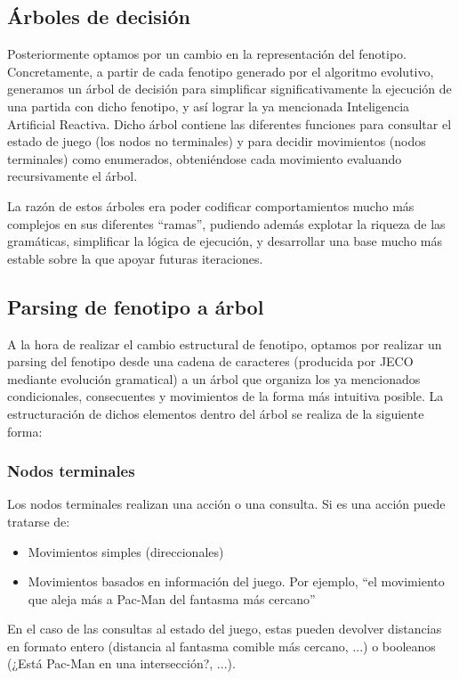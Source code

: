 \subsection{Árboles de decisión}
Posteriormente optamos por un cambio en la representación del fenotipo. Concretamente, a partir de cada fenotipo generado por el algoritmo evolutivo, generamos un árbol de decisión para simplificar significativamente la ejecución de una partida con dicho fenotipo, y así lograr la ya mencionada Inteligencia Artificial Reactiva. Dicho árbol contiene las diferentes funciones para consultar el estado de juego (los nodos no terminales) y para decidir movimientos (nodos terminales) como enumerados, obteniéndose cada movimiento evaluando recursivamente el árbol.
 
La razón de estos árboles era poder codificar comportamientos mucho más complejos en sus diferentes ``ramas'', pudiendo además explotar la riqueza de las gramáticas, simplificar la lógica de ejecución, y desarrollar una base mucho más estable sobre la que apoyar futuras iteraciones.

\subsection{Parsing de fenotipo a árbol}
A la hora de realizar el cambio estructural de fenotipo, optamos por realizar un parsing del fenotipo desde una cadena de caracteres (producida por JECO mediante evolución gramatical) a un árbol que organiza los ya mencionados condicionales, consecuentes y movimientos de la forma más intuitiva posible. La estructuración de dichos elementos dentro del árbol se realiza de la siguiente forma:

\subsubsection{Nodos terminales}
Los nodos terminales realizan una acción o una consulta. Si es una acción puede tratarse de:
\begin{itemize}
\item Movimientos simples (direccionales)
\item Movimientos basados en información del juego. Por ejemplo, ``el movimiento que aleja más a Pac-Man del fantasma más cercano''
\end{itemize}

En el caso de las consultas al estado del juego, estas pueden devolver distancias en formato entero (distancia al fantasma comible más cercano, ...) o booleanos (¿Está Pac-Man en una intersección?, ...).

